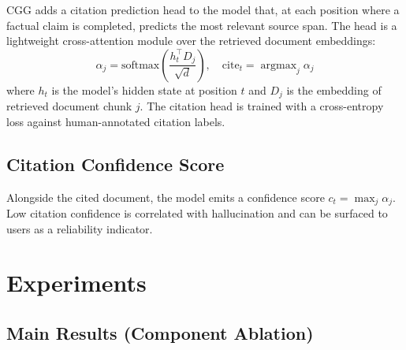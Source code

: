 \documentclass[11pt,a4paper]{article}
\begin{document}
CGG adds a citation prediction head to the model that, at each position where a factual
claim is completed, predicts the most relevant source span. The head is a lightweight
cross-attention module over the retrieved document embeddings:
\begin{equation}
    \alpha_j = \text{softmax}\!\left(\frac{h_t^\top D_j}{\sqrt{d}}\right), \quad
    \text{cite}_t = \operatorname{argmax}_j \alpha_j
    \label{eq:cite}
\end{equation}
where $h_t$ is the model's hidden state at position $t$ and $D_j$ is the embedding of
retrieved document chunk $j$. The citation head is trained with a cross-entropy loss
against human-annotated citation labels.

\subsection{Citation Confidence Score}

Alongside the cited document, the model emits a confidence score $c_t = \max_j \alpha_j$.
Low citation confidence is correlated with hallucination and can be surfaced to users
as a reliability indicator.

\section{Experiments}
\label{sec:experiments}

\subsection{Main Results (Component Ablation)}
\end{document}
